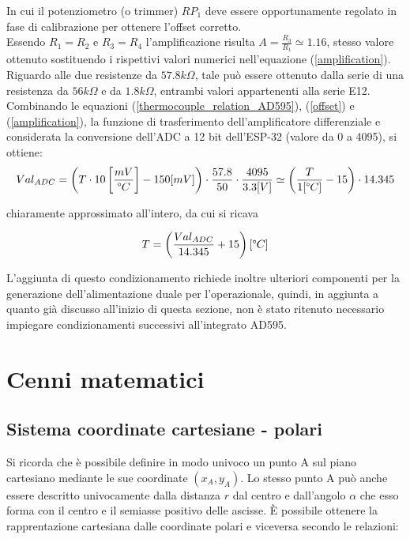 \documentclass[12pt]{article}
\begin{document}
        \noindent
        In cui il potenziometro (o trimmer) $RP_1$ deve essere opportunamente regolato in fase di calibrazione per ottenere l'offset corretto.\\
        Essendo $R_1=R_2$ e $R_3=R_4$ l'amplificazione risulta $A = \frac{R_3}{R_1} \simeq 1.16$, stesso valore ottenuto sostituendo i rispettivi valori numerici nell'equazione (\ref{amplification}). Riguardo alle due resistenze da $57.8 k\Omega$, tale può essere ottenuto dalla serie di una resistenza da $56 k\Omega$ e da $1.8 k\Omega$, entrambi valori appartenenti alla serie E12.\\
        Combinando le equazioni (\ref{thermocouple_relation_AD595}), (\ref{offset}) e (\ref{amplification}), la funzione di trasferimento dell'amplificatore differenziale e considerata la conversione dell'ADC a 12 bit dell'ESP-32 (valore da 0 a 4095), si ottiene:
        \begin{equation}
            Val_{ADC} = \left( T \cdot 10 \left[ \frac{mV}{\degree C} \right] - 150 [mV] \right) \cdot \frac{57.8}{50} \cdot \frac{4095}{3.3[V]} \simeq \left( \frac{T}{1 [\degree C]} - 15 \right) \cdot  14.345
        \end{equation}
        
        \noindent
        chiaramente approssimato all'intero, da cui si ricava
        
        \begin{equation}
            T = \left( \frac{Val_{ADC}}{14.345} + 15 \right) [\degree C]
        \end{equation}
    
        \noindent
        L'aggiunta di questo condizionamento richiede inoltre ulteriori componenti per la generazione dell'alimentazione duale per l'operazionale, quindi, in aggiunta a quanto già discusso all'inizio di questa sezione, non è stato ritenuto necessario impiegare condizionamenti successivi all'integrato AD595.

\newpage
\section{Cenni matematici}
    \subsection{Sistema coordinate cartesiane - polari}
    Si ricorda che è possibile definire in modo univoco un punto A sul piano cartesiano mediante le sue coordinate $(x_A, y_A)$. Lo stesso punto A può anche essere descritto univocamente dalla distanza $r$ dal centro e dall'angolo $\alpha$ che esso forma con il centro e il semiasse positivo delle ascisse. È possibile ottenere la rapprentazione cartesiana dalle coordinate polari e viceversa secondo le relazioni:
    
\end{document}
